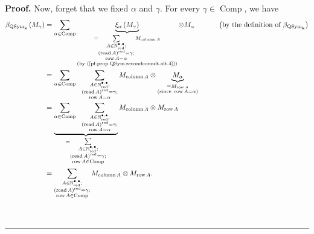 \documentclass
[numbers=enddot,12pt,final,onecolumn,notitlepage,abstracton]{scrartcl}%
\theoremstyle{definition}
\newenvironment{proof}[1][Proof]{\noindent\textbf{#1.} }{\ \rule{0.5em}{0.5em}}
\let\sumnonlimits\sum
\renewcommand{\sum}{\sumnonlimits\limits}
\begin{document}
\begin{proof}
Now, forget that we fixed $\alpha$ and $\gamma$. For every $\gamma
\in\operatorname*{Comp}$, we have%
\begin{align}
\beta_{\operatorname*{QSym}\nolimits_{\mathbf{k}}}\left(  M_{\gamma}\right)
&  =\sum_{\alpha\in\operatorname*{Comp}}\underbrace{\xi_{\alpha}\left(
M_{\gamma}\right)  }_{\substack{=\sum_{\substack{A\in\mathbb{N}%
_{\operatorname*{red}}^{\bullet,\bullet}\text{;}\\\left(  \operatorname*{read}%
A\right)  ^{\operatorname*{red}}=\gamma\text{;}\\\operatorname*{row}A=\alpha
}}M_{\operatorname*{column}A}\\\text{(by
(\ref{pf.prop.QSym.secondcomult.alt.4}))}}}\otimes M_{\alpha}%
\ \ \ \ \ \ \ \ \ \ \left(  \text{by the definition of }\beta
_{\operatorname*{QSym}\nolimits_{\mathbf{k}}}\right) \nonumber\\
&  =\sum_{\alpha\in\operatorname*{Comp}}\ \ \sum_{\substack{A\in
\mathbb{N}_{\operatorname*{red}}^{\bullet,\bullet}\text{;}\\\left(
\operatorname*{read}A\right)  ^{\operatorname*{red}}=\gamma\text{;}%
\\\operatorname*{row}A=\alpha}}M_{\operatorname*{column}A}\otimes
\underbrace{M_{\alpha}}_{\substack{=M_{\operatorname*{row}A}\\\text{(since
}\operatorname*{row}A=\alpha\text{)}}}\nonumber\\
&  =\underbrace{\sum_{\alpha\in\operatorname*{Comp}}\ \ \sum_{\substack{A\in
\mathbb{N}_{\operatorname*{red}}^{\bullet,\bullet}\text{;}\\\left(
\operatorname*{read}A\right)  ^{\operatorname*{red}}=\gamma\text{;}%
\\\operatorname*{row}A=\alpha}}}_{=\sum_{\substack{A\in\mathbb{N}%
_{\operatorname*{red}}^{\bullet,\bullet}\text{;}\\\left(  \operatorname*{read}%
A\right)  ^{\operatorname*{red}}=\gamma\text{;}\\\operatorname*{row}%
A\in\operatorname*{Comp}}}}M_{\operatorname*{column}A}\otimes
M_{\operatorname*{row}A}\nonumber\\
&  =\sum_{\substack{A\in\mathbb{N}_{\operatorname*{red}}^{\bullet,\bullet
}\text{;}\\\left(  \operatorname*{read}A\right)  ^{\operatorname*{red}}%
=\gamma\text{;}\\\operatorname*{row}A\in\operatorname*{Comp}}%
}M_{\operatorname*{column}A}\otimes M_{\operatorname*{row}A}.
\label{pf.prop.QSym.secondcomult.alt.-2}%
\end{align}



\end{proof}
\end{document}
